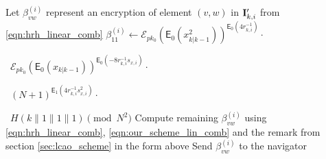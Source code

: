 \documentclass[10pt,letterpaper,oneside,twocolumn,journal]{IEEEtran}
\theoremstyle{definition}
\theoremstyle{definition}
\theoremstyle{remark}
\begin{document}
\begin{algorithm}[htbp]
\begin{algorithmic}[1]
    \State Let $\beta_{vw}^{(i)}$ represent an encryption of element $(v,w)$ in ${{\mathbf{I}}}'_{k,i}$ from \eqref{eqn:hrh_linear_comb}
    \State $\beta_{11}^{(i)} \gets \mathcal{E}_{pk_0}(\mathsf{E}_{0}(x^2_{k|k-1}))^{\mathsf{E}_{0}(4r_{k,i}^{-1})}\cdot$\par
    \ $\mathcal{E}_{pk_0}(\mathsf{E}_{0}(x_{k|k-1}))^{\mathsf{E}_{0}(-8r_{k, i}^{-1}s_{x,i})}\cdot$\par
    \ $(N+1)^{\mathsf{E}_{1}(4r_{k,i}^{-1}s_{x,i}^2)}\cdot$\par
    \ $H(k\mathbin\|1\mathbin\|1\mathbin\|1)\pmod{N^2}$
    \State Compute remaining $\beta_{vw}^{(i)}$ using \eqref{eqn:hrh_linear_comb}, \eqref{eqn:our_scheme_lin_comb} and the remark from section \ref{sec:lcao_scheme} in the form above
            \State Send $\beta_{vw}^{(i)}$ to the navigator
        \EndFor
    \EndFor
    \EndProcedure
\end{algorithmic}
\end{algorithm}
\end{document}

